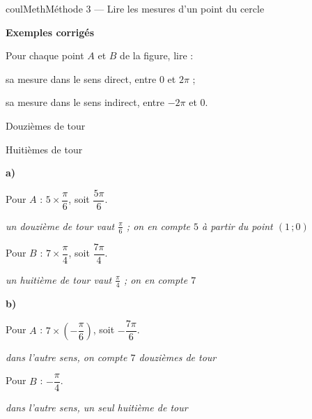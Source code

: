 \documentclass[11pt,a4paper]{article}
\makeatletter
\newcounter{lycee@signet}
\newcommand{\signet}[3][]{\stepcounter{lycee@signet}%
  \edef\lycee@dest{\if\relax\detokenize{#1}\relax
    signet.\arabic{lycee@signet}\else#1\fi}%
  \hypertarget{\lycee@dest}{}\bookmark[level=#2,dest=\lycee@dest]{#3}}
\newcommand{\res}[1]{#1}
\newcounter{methode}
\newenvironment{methodebox}[1][Méthode]{\stepcounter{methode}%
  \begin{boitecours}[phantom={\signet[methode-\arabic{methode}]{2}{#1}}]{coulMeth}{#1}}%
  {\end{boitecours}}
\newcommand{\etape}[1]{\par\smallskip\textbf{\color{coulMeth}#1}\par\nobreak\smallskip}
\newcommand{\explique}[2]{\par\smallskip\noindent
  \begin{minipage}[t]{0.57\linewidth}\raggedright #1\end{minipage}\hfill
  \begin{minipage}[t]{0.40\linewidth}\raggedright\leavevmode
    {\small\itshape\color{black!60}#2}\end{minipage}\par}
\newcommand{\cas}[1]{\par\smallskip\noindent\textbf{\color{coulExo}#1}\vadjust{\nobreak}}
\newenvironment{correction}{\par}{\par}
\newcommand{\etapeexemples}{\etape{Exemples corrigés}}
\makeatother
\begin{document}
\begin{methodebox}[Méthode 3 --- Lire les mesures d'un point du cercle]
\etapeexemples
\begin{minipage}[c]{0.40\linewidth}\raggedright
Pour chaque point $A$ et $B$ de la figure, lire :
\begin{questions}[label=\alph*)]
  \item sa mesure dans le sens direct, entre $0$ et $2\pi$ ;
  \item sa mesure dans le sens indirect, entre $-2\pi$ et $0$.
\end{questions}
\end{minipage}\hfill
\begin{minipage}[c]{0.28\linewidth}\centering
Douzièmes de tour\par
{}
\end{minipage}\hfill
\begin{minipage}[c]{0.28\linewidth}\centering
Huitièmes de tour\par
{}
\end{minipage}
\begin{correction}
\cas{a)}
\explique{Pour $A$ : $5\times\dfrac{\pi}{6}$, soit $\res{\dfrac{5\pi}{6}}$.}{un douzième de tour vaut $\tfrac{\pi}{6}$ ; on en compte $5$ à partir du point $(1\,;0)$}
\explique{Pour $B$ : $7\times\dfrac{\pi}{4}$, soit $\res{\dfrac{7\pi}{4}}$.}{un huitième de tour vaut $\tfrac{\pi}{4}$ ; on en compte $7$}
\cas{b)}
\explique{Pour $A$ : $7\times\left(-\dfrac{\pi}{6}\right)$, soit $\res{-\dfrac{7\pi}{6}}$.}{dans l'autre sens, on compte $7$ douzièmes de tour}
\explique{Pour $B$ : $\res{-\dfrac{\pi}{4}}$.}{dans l'autre sens, un seul huitième de tour}
\end{correction}


\end{methodebox}
\end{document}
